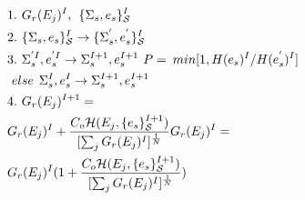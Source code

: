 \documentclass[aps,prl,reprint,superscriptaddress,showkeys]{revtex4-1}
\begin{document}
\begin{equation}
\begin{split}
&1.\hspace{0.125cm} G_{r}(E_j)^I ,\hspace{0.15cm}  \{\Sigma_{s},e_s\}_{\mathcal{S}}^I\\
&2. \hspace{0.125cm}\{\Sigma_{s},e_s\}_{\mathcal{S}}^I \rightarrow  \{\Sigma_{s}^{'},e_s^{'}\}_{\mathcal{S}}^I\\
&3. \hspace{0.125cm} \Sigma_{s}^{'I}, e_s^{'I} \rightarrow \Sigma_{s}^{I+1},e_s^{I+1}   \hspace{0.125cm} P = \hspace{0.075cm} min [1, H(e_s)^{I}/H(e_s^{'})^{I}]\\
& \hspace{0.125cm}else  \hspace{0.15cm} \Sigma_{s}^I, e_s^I \rightarrow \Sigma_{s}^{I+1}, e_s^{I+1}\\
&4. \hspace{0.125cm} G_{r}(E_j)^{I+1} =  \\
& G_{r}(E_j)^{I} + \frac{C_o \mathcal{H}(E_j,\{e_s\}_{\mathcal{S}}^{I+1}) }{ [\sum_j G_{r}(E_j)^{I}]^{\frac{1}{N} } }G_{r}(E_j)^{I} = \\
& G_{r}(E_j)^{I}( 1 +  \frac{C_o \mathcal{H}(E_j,\{e_s\}_{\mathcal{S}}^{I+1}) }{ [\sum_j G_{r}(E_j)^{I}]^{\frac{1}{N} } } )\\
\end{split}
\label{blender}
\end{equation}
\end{document}
